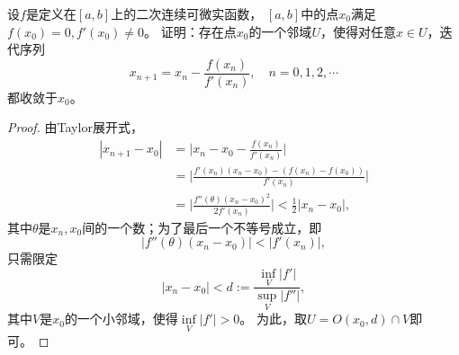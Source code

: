 \begin{7}[Newton迭代法]
    设$f$是定义在$[a,b]$上的二次连续可微实函数，
    $[a,b]$中的点$x_0$满足$f(x_0)=0,f'(x_0)\ne0$。
    证明：存在点$x_0$的一个邻域$U$，使得对任意$x \in U$，迭代序列
    \[x_{n+1}=x_n-\frac{f(x_n)}{f'(x_n)},\quad n=0,1,2,\cdots\]
    都收敛于$x_0$。
\end{7}
\begin{proof}
    由Taylor展开式，
    \begin{align*}
        |x_{n+1}-x_0|&=\bigg|x_n-x_0-\frac{f(x_n)}{f'(x_n)}\bigg|\\
        &=\bigg|\frac{f'(x_n)(x_n-x_0)-(f(x_n)-f(x_0))}{f'(x_n)}\bigg|\\
        &=\bigg|\frac{f''(\theta)(x_n-x_0)^2}{2f'(x_n)}\bigg|
        <\frac{1}{2}|x_n-x_0|,
    \end{align*}
    其中$\theta$是$x_n,x_0$间的一个数；为了最后一个不等号成立，即
    \[|f''(\theta)(x_n-x_0)|<|f'(x_n)|,\]
    只需限定
    \[|x_n-x_0|<d:=\frac{\inf\limits_{V}|f'|}{\sup\limits_{V}|f''|},\]
    其中$V$是$x_0$的一个小邻域，使得$\inf\limits_{V}|f'|>0$。
    为此，取$U=O(x_0,d) \cap V$即可。
\end{proof}


